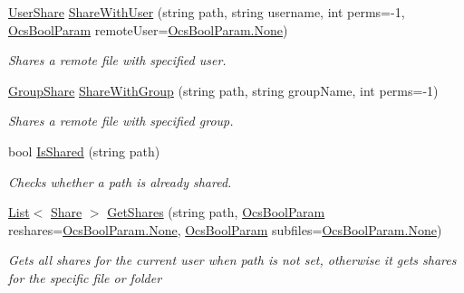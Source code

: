 \begin{DoxyCompactItemize}
\hyperlink{classowncloudsharp_1_1_types_1_1_user_share}{User\+Share} \hyperlink{classowncloudsharp_1_1_client_a69d7df9c2e91b8716bb0c5a2f5ff7878}{Share\+With\+User} (string path, string username, int perms=-\/1, \hyperlink{namespaceowncloudsharp_a7d494b18f174086318df1bdf916068b5}{Ocs\+Bool\+Param} remote\+User=\hyperlink{namespaceowncloudsharp_a86ba7b86b85c7f5be2304a1ef7ae3157a6adf97f83acf6453d4a6a4b1070f3754}{Ocs\+Bool\+Param.\+None})
\begin{DoxyCompactList}\small\item\em Shares a remote file with specified user. \end{DoxyCompactList}\item 
\hyperlink{classowncloudsharp_1_1_types_1_1_group_share}{Group\+Share} \hyperlink{classowncloudsharp_1_1_client_a22625407b475bd43c292fc80fbcebad9}{Share\+With\+Group} (string path, string group\+Name, int perms=-\/1)
\begin{DoxyCompactList}\small\item\em Shares a remote file with specified group. \end{DoxyCompactList}\item 
bool \hyperlink{classowncloudsharp_1_1_client_a241b88019805ddd87e8d596a6cf6c7a9}{Is\+Shared} (string path)
\begin{DoxyCompactList}\small\item\em Checks whether a path is already shared. \end{DoxyCompactList}\item 
\hyperlink{classowncloudsharp_1_1_client_a914c144ebbe207958829523f7eda3609}{List}$<$ \hyperlink{classowncloudsharp_1_1_types_1_1_share}{Share} $>$ \hyperlink{classowncloudsharp_1_1_client_acd8b3359561282563c774b6e4784cb3d}{Get\+Shares} (string path, \hyperlink{namespaceowncloudsharp_a7d494b18f174086318df1bdf916068b5}{Ocs\+Bool\+Param} reshares=\hyperlink{namespaceowncloudsharp_a86ba7b86b85c7f5be2304a1ef7ae3157a6adf97f83acf6453d4a6a4b1070f3754}{Ocs\+Bool\+Param.\+None}, \hyperlink{namespaceowncloudsharp_a7d494b18f174086318df1bdf916068b5}{Ocs\+Bool\+Param} subfiles=\hyperlink{namespaceowncloudsharp_a86ba7b86b85c7f5be2304a1ef7ae3157a6adf97f83acf6453d4a6a4b1070f3754}{Ocs\+Bool\+Param.\+None})
\begin{DoxyCompactList}\small\item\em Gets all shares for the current user when {\ttfamily path} is not set, otherwise it gets shares for the specific file or folder \end{DoxyCompactList}\item 

\end{DoxyCompactItemize}
